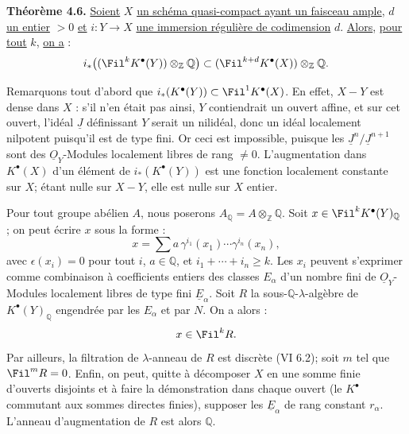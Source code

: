 
\textbf{Théorème 4.6.}
\uline{Soient} \(X\) \uline{un schéma quasi-compact ayant un faisceau ample}, \(d\) \uline{un entier} \(>0\) \uline{et} \(i:Y\to X\) \uline{une immersion régulière de codimension} \(d\). \uline{Alors}, \uline{pour tout} \(k\), \uline{on a} :
\[
 i_*\bigl((\Fil^kK^{\bullet}(Y))\otimes_{\mathbb Z}\mathbb Q\bigr)
 \subset
 (\Fil^{k+d}K^{\bullet}(X))\otimes_{\mathbb Z}\mathbb Q.
\]

Remarquons tout d'abord que \(i_*(K^{\bullet}(Y))\subset \Fil^1K^{\bullet}(X)\). En effet, \(X-Y\) est dense dans \(X\) : s'il n'en était pas ainsi, \(Y\) contiendrait un ouvert affine, et sur cet ouvert, l'idéal \(\underline{J}\) définissant \(Y\) serait un nilidéal, donc un idéal localement nilpotent puisqu'il est de type fini. Or ceci est impossible, puisque les \(\underline{J}^n/\underline{J}^{n+1}\) sont des \(\underline{O}_Y\)-Modules localement libres de rang \(\ne0\). L'augmentation dans \(K^{\bullet}(X)\) d'un élément de \(i_*(K^{\bullet}(Y))\) est une fonction localement constante sur \(X\); étant nulle sur \(X-Y\), elle est nulle sur \(X\) entier.

Pour tout groupe abélien \(A\), nous poserons \(A_{\mathbb Q}=A\otimes_{\mathbb Z}\mathbb Q\). Soit \(x\in\Fil^kK^{\bullet}(Y)_{\mathbb Q}\) ; on peut écrire \(x\) sous la forme :
\[
  x=\sum a\,\gamma^{i_1}(x_1)\cdots\gamma^{i_n}(x_n),
\]
avec \(\epsilon(x_i)=0\) pour tout \(i\), \(a\in\mathbb Q\), et \(i_1+\cdots+i_n\ge k\). Les \(x_i\) peuvent s'exprimer comme combinaison à coefficients entiers des classes \(E_\alpha\) d'un nombre fini de \(\underline{O}_Y\)-Modules localement libres de type fini \(\underline{E}_\alpha\). Soit \(R\) la sous-\(\mathbb Q\)-\(\lambda\)-algèbre de \(K^{\bullet}(Y)_{\mathbb Q}\) engendrée par les \(E_\alpha\) et par \(N\). On a alors :
\[
  x\in\Fil^kR.
\]
Par ailleurs, la filtration de \(\lambda\)-anneau de \(R\) est discrète (VI 6.2); soit \(m\) tel que \(\Fil^mR=0\). Enfin, on peut, quitte à décomposer \(X\) en une somme finie d'ouverts disjoints et à faire la démonstration dans chaque ouvert (le \(K^{\bullet}\) commutant aux sommes directes finies), supposer les \(\underline{E}_\alpha\) de rang constant \(r_\alpha\). L'anneau d'augmentation de \(R\) est alors \(\mathbb Q\).


